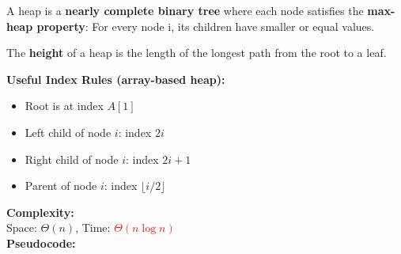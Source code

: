 \documentclass[a4paper,landscape]{article}
\newcommand{\timecomplexity}[1]{\textcolor{red}{#1}}
\begin{document}
\begin{multicols}{7}
\tcolorbox[mybox={Heap Sort}]
A heap is a \textbf{nearly complete binary tree} where each node satisfies the \textbf{max-heap property}:
For every node i, its children have smaller or equal values.

The \textbf{height} of a heap is the length of the longest path from the root to a leaf.

\textbf{Useful Index Rules (array-based heap):}
\begin{itemize}[noitemsep, topsep=0pt]
    \item Root is at index \( A[1] \)
    \item Left child of node \( i \): index \( 2i \)
    \item Right child of node \( i \): index \( 2i + 1 \)
    \item Parent of node \( i \): index \( \lfloor i/2 \rfloor \)
\end{itemize}

\textbf{Complexity:} \\
Space: \( \Theta(n) \), Time: \timecomplexity{\( \Theta(n \log n) \)} \\
\textbf{Pseudocode:}\\
\noindent %

\vspace{1em} %

\noindent %


\end{multicols}
\end{document}
